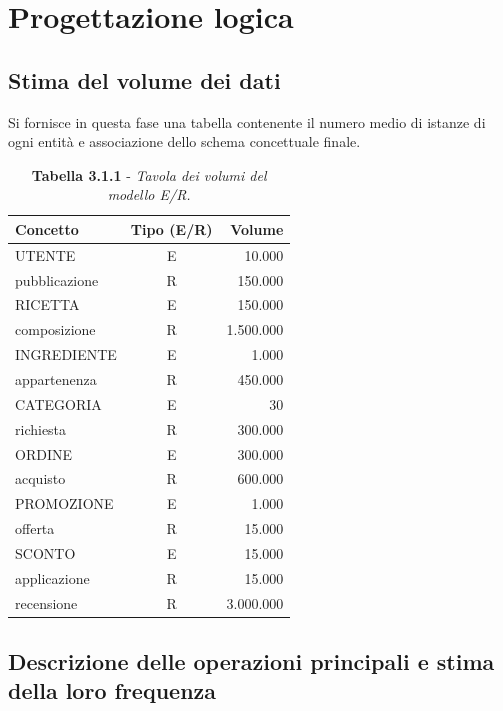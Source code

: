 \chapter{Progettazione logica}

\section{Stima del volume dei dati}

Si fornisce in questa fase una tabella contenente il numero medio di istanze di ogni entità e associazione dello schema concettuale finale.

\begin{table}[H]
\centering
\renewcommand{\arraystretch}{1.3} %
\setlength{\tabcolsep}{10pt}     %

\begin{tabularx}{\textwidth}{|X|c|r|}
\hline
\textbf{Concetto} & \textbf{Tipo (E/R)} & \textbf{Volume} \\
\hline
UTENTE & E & 10.000 \\
\hline
pubblicazione & R & 150.000 \\
\hline
RICETTA & E & 150.000 \\
\hline
composizione & R & 1.500.000 \\
\hline
INGREDIENTE & E & 1.000 \\
\hline
appartenenza & R & 450.000 \\
\hline
CATEGORIA & E & 30 \\
\hline
richiesta & R & 300.000 \\
\hline
ORDINE & E & 300.000 \\
\hline
acquisto & R & 600.000 \\
\hline
PROMOZIONE & E & 1.000 \\
\hline
offerta & R & 15.000 \\
\hline
SCONTO & E & 15.000 \\
\hline
applicazione & R & 15.000 \\
\hline
recensione & R & 3.000.000 \\
\hline
\end{tabularx}
\caption*{\textbf{Tabella 3.1.1} - \textit{Tavola dei volumi del modello E/R.}}
\end{table}


\section{Descrizione delle operazioni principali e stima della loro frequenza}

